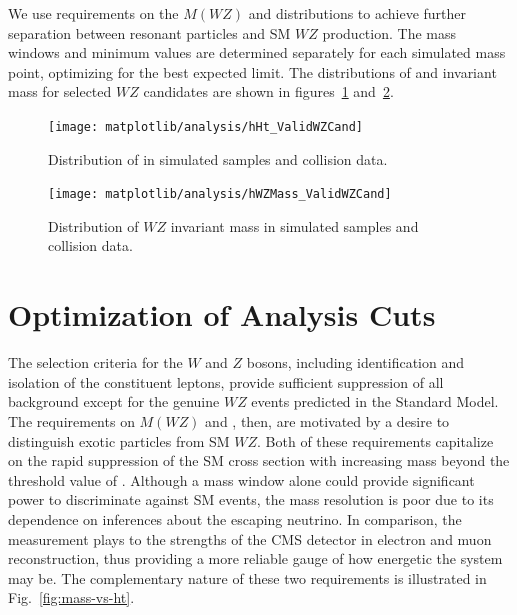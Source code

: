 We use requirements on the $M(WZ)$ and \lepht distributions to achieve further separation between resonant particles and SM $WZ$ production.  The mass windows and minimum \lepht values are determined separately for each simulated mass point, optimizing for the best expected limit.  The distributions of \lepht and invariant mass for selected $WZ$ candidates are shown in figures~\ref{fig:ht} and~\ref{fig:mwz}.

\begin{figure}
  \centering
  \texttt{[image: matplotlib/analysis/hHt\_ValidWZCand]}
  \caption{Distribution of \lepht in simulated samples and collision data.}
  \label{fig:ht}
\end{figure}

\begin{figure}
  \centering
  \texttt{[image: matplotlib/analysis/hWZMass\_ValidWZCand]}
  \caption{Distribution of $WZ$ invariant mass in simulated samples and collision data.}
  \label{fig:mwz}
\end{figure}

\section{Optimization of Analysis Cuts}
The selection criteria for the $W$ and $Z$ bosons, including identification and isolation of the constituent leptons, provide sufficient suppression of all background except for the genuine $WZ$ events predicted in the Standard Model.  The requirements on $M(WZ)$ and \lepht, then, are motivated by a desire to distinguish exotic particles from SM $WZ$.  Both of these requirements capitalize on the rapid suppression of the SM cross section with increasing mass beyond the threshold value of .  Although a mass window alone could provide significant power to discriminate against SM events, the mass resolution is poor due to its dependence on inferences about the escaping neutrino.  In comparison, the \lepht measurement plays to the strengths of the CMS detector in electron and muon reconstruction, thus providing a more reliable gauge of how energetic the system may be.  The complementary nature of these two requirements is illustrated in Fig.~\ref{fig:mass-vs-ht}.


